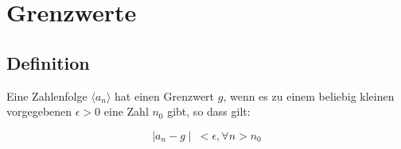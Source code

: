 \section{Grenzwerte}



\subsection{Definition}

Eine Zahlenfolge \( \langle a_n \rangle \) hat einen Grenzwert \(g\),
wenn es zu einem beliebig kleinen vorgegebenen \(\epsilon > 0\)
eine Zahl \(n_0\) gibt, so dass gilt:

\[
    \mid a_n - g \mid\ < \epsilon, \forall n > n_0
\]


